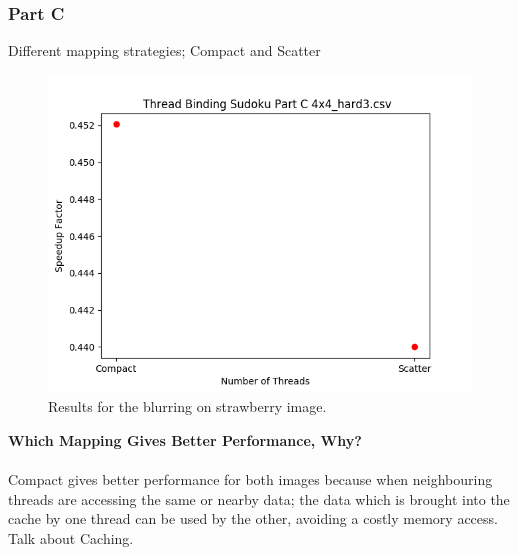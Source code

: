 \documentclass{article}
\newcommand\tab[1][0.5cm]{\hspace*{#1}}
\begin{document}
\subsubsection{Part C}
\begin{description}
    \item[Different mapping strategies; Compact and Scatter]
\end{description}
\begin{figure}[!htb]
    \centering
    \includegraphics[width=1\linewidth]{./img/binding_part_2_C.png}
    \caption{Results for the blurring on strawberry image.}
\end{figure}
\textbf{Which Mapping Gives Better Performance, Why?}\\
\\ \tab Compact gives better performance for both images because 
when neighbouring threads are accessing the same or nearby data;
the data which is brought into the cache by one thread can be used 
by the other, avoiding a costly memory access.
\\ Talk about Caching.

\newpage
\end{document}
